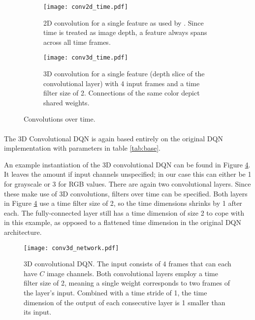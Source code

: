 \begin{figure}[!htpb]
  \begin{subfigure}[t]{.45\textwidth}
    \centering
    \texttt{[image: conv2d\_time.pdf]}
    \caption{
      2D convolution for a single feature as used by \cite{Mnih2013}.
      Since time is treated as image depth,
      a feature always spans across all time frames.
    }
    \label{fig:conv2d_time}
  \end{subfigure}
  \hfill
  \begin{subfigure}[t]{.45\textwidth}
    \centering
    \texttt{[image: conv3d\_time.pdf]}
    \caption{
      3D convolution for a single feature
      (depth slice of the convolutional layer)
      with 4 input frames
      and a time filter size of 2.
      Connections of the same color depict shared weights.
    }
    \label{fig:conv3d_time}
  \end{subfigure}
  \caption{
    Convolutions over time.
  }
  \label{fig:conv3d}
\end{figure}

\paragraph{}
The 3D Convolutional DQN
is again based entirely on the original DQN implementation
with parameters in table \ref{tab:base}.

An example instantiation of the 3D convolutional DQN
can be found in Figure \ref{fig:conv3d_network}.
It leaves the amount if input channels unspecified;
in our case this can either be 1 for grayscale
or 3 for RGB values.
There are again two convolutional layers.
Since these make use of 3D convolutions,
filters over time can be specified.
Both layers in Figure \ref{fig:conv3d_network}
use a time filter size of 2,
so the time dimensions shrinks by 1 after each.
The fully-connected layer
still has a time dimension of size 2 to cope with in this example,
as opposed to a flattened time dimension in the original DQN architecture.

\begin{figure}[htpb]
  \centering
  \texttt{[image: conv3d\_network.pdf]}
  \caption{
    3D convolutional DQN.
    The input consists of 4 frames
    that can each have $C$ image channels.
    Both convolutional layers employ a time filter size of 2,
    meaning a single weight corresponds to
    two frames of the layer's input.
    Combined with a time stride of 1,
    the time dimension of the output of each consecutive layer
    is 1 smaller than its input.
  }
  \label{fig:conv3d_network}
\end{figure}

